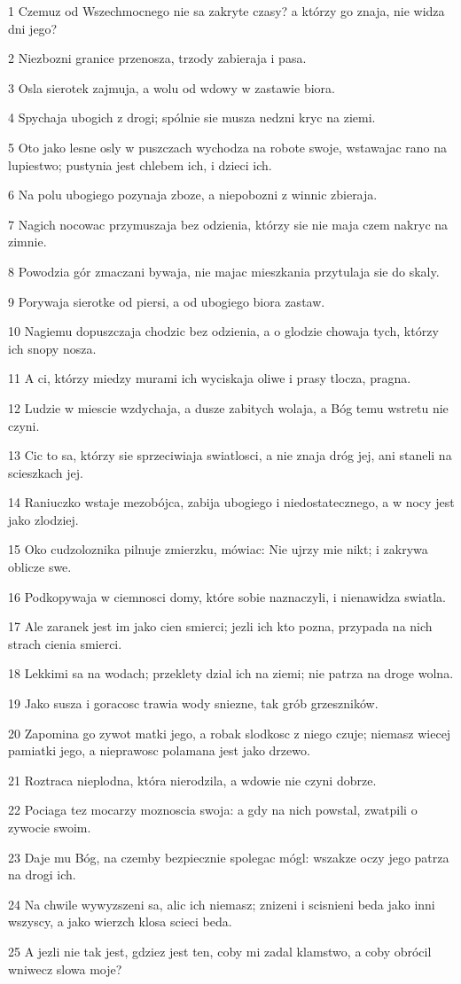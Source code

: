 \par 1 Czemuz od Wszechmocnego nie sa zakryte czasy? a którzy go znaja, nie widza dni jego?
\par 2 Niezbozni granice przenosza, trzody zabieraja i pasa.
\par 3 Osla sierotek zajmuja, a wolu od wdowy w zastawie biora.
\par 4 Spychaja ubogich z drogi; spólnie sie musza nedzni kryc na ziemi.
\par 5 Oto jako lesne osly w puszczach wychodza na robote swoje, wstawajac rano na lupiestwo; pustynia jest chlebem ich, i dzieci ich.
\par 6 Na polu ubogiego pozynaja zboze, a niepobozni z winnic zbieraja.
\par 7 Nagich nocowac przymuszaja bez odzienia, którzy sie nie maja czem nakryc na zimnie.
\par 8 Powodzia gór zmaczani bywaja, nie majac mieszkania przytulaja sie do skaly.
\par 9 Porywaja sierotke od piersi, a od ubogiego biora zastaw.
\par 10 Nagiemu dopuszczaja chodzic bez odzienia, a o glodzie chowaja tych, którzy ich snopy nosza.
\par 11 A ci, którzy miedzy murami ich wyciskaja oliwe i prasy tlocza, pragna.
\par 12 Ludzie w miescie wzdychaja, a dusze zabitych wolaja, a Bóg temu wstretu nie czyni.
\par 13 Cic to sa, którzy sie sprzeciwiaja swiatlosci, a nie znaja dróg jej, ani staneli na scieszkach jej.
\par 14 Raniuczko wstaje mezobójca, zabija ubogiego i niedostatecznego, a w nocy jest jako zlodziej.
\par 15 Oko cudzoloznika pilnuje zmierzku, mówiac: Nie ujrzy mie nikt; i zakrywa oblicze swe.
\par 16 Podkopywaja w ciemnosci domy, które sobie naznaczyli, i nienawidza swiatla.
\par 17 Ale zaranek jest im jako cien smierci; jezli ich kto pozna, przypada na nich strach cienia smierci.
\par 18 Lekkimi sa na wodach; przeklety dzial ich na ziemi; nie patrza na droge wolna.
\par 19 Jako susza i goracosc trawia wody sniezne, tak grób grzeszników.
\par 20 Zapomina go zywot matki jego, a robak slodkosc z niego czuje; niemasz wiecej pamiatki jego, a nieprawosc polamana jest jako drzewo.
\par 21 Roztraca nieplodna, która nierodzila, a wdowie nie czyni dobrze.
\par 22 Pociaga tez mocarzy moznoscia swoja: a gdy na nich powstal, zwatpili o zywocie swoim.
\par 23 Daje mu Bóg, na czemby bezpiecznie spolegac mógl: wszakze oczy jego patrza na drogi ich.
\par 24 Na chwile wywyzszeni sa, alic ich niemasz; znizeni i scisnieni beda jako inni wszyscy, a jako wierzch klosa scieci beda.
\par 25 A jezli nie tak jest, gdziez jest ten, coby mi zadal klamstwo, a coby obrócil wniwecz slowa moje?

